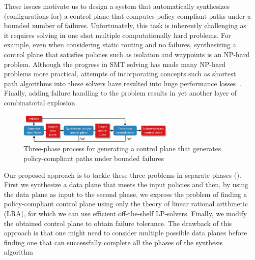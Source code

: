 These issues motivate us to design a system that automatically synthesizes
(configurations for) a control plane that computes policy-compliant paths
under a bounded number of failures.
Unfortunately, this task is inherently challenging as it requires solving in one shot multiple
computationally hard problems.
For example, even when considering static routing and no failures, synthesizing a control plane that satisfies  policies such as isolation and waypoints
is an NP-hard problem.
Although the progress in SMT solving has made many NP-hard problems more practical, 
 attempts of incorporating concepts such as shortest path algorithms 
into these solvers have resulted into huge performance losses~\cite{monosat}. 
Finally, adding failure handling to the problem results in yet another layer of combinatorial explosion.

\begin{figure}
\centering
\includegraphics[width=0.7\textwidth]{figures/process.pdf}
\caption{Three-phase process for generating a control plane that generates
    policy-compliant paths under bounded failures}
\label{fig:process}
\end{figure}


Our proposed approach is to tackle these three problems in separate phases
().
First we synthesize a data plane that meets the input policies and then,
by using the data plane as input to the second phase, we 
express the problem of finding a policy-compliant control plane using only the 
theory of linear rational arithmetic (LRA), for which we can use
efficient off-the-shelf LP-solvers. 
Finally, we modify the obtained control plane to obtain failure tolerance.
The drawback of this approach is that one might need to consider multiple possible
data planes before finding one that can successfully complete all the phases of the
synthesis algorithm

